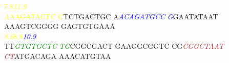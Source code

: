\documentclass[11pt,twoside,reqno,a4paper]{article}
\begin{document}
{\hspace*{1\charwidth}\hspace*{10\charwidth}\textcolor{Yellow}{7.8}\hspace*{1\charwidth}\hspace*{1\charwidth}\hspace*{1\charwidth}\hspace*{1\charwidth}\hspace*{10\charwidth}\textit{\textcolor{Yellow}{11.9}}\hspace*{1\charwidth}\hspace*{1\charwidth}\hspace*{1\charwidth}\\
\textit{\textcolor{Yellow}{A}}\textcolor{Yellow}{A}\textcolor{Yellow}{A}\textcolor{Yellow}{G}\textcolor{Yellow}{A}\textcolor{Yellow}{T}\textcolor{Yellow}{A}\textcolor{Yellow}{C}\textcolor{Yellow}{T}\textcolor{Yellow}{C}	\textcolor{Yellow}{C}TCTGACTGC	A\textit{\textcolor{Blue}{A}}\textit{\textcolor{Blue}{C}}\textit{\textcolor{Blue}{A}}\textit{\textcolor{Blue}{G}}\textit{\textcolor{Blue}{A}}\textit{\textcolor{Blue}{T}}\textit{\textcolor{Blue}{G}}\textit{\textcolor{Blue}{C}}\textit{\textcolor{Blue}{C}}	\textit{\textcolor{Blue}{G}}GAATATAAT	AAAGTCGGGG	GAGTGTGAAA	\\
\hspace*{0\charwidth}\textit{\textcolor{Yellow}{8.6}}\hspace*{-48\charwidth}\textcolor{Yellow}{8.8}\hspace*{1\charwidth}\hspace*{1\charwidth}\hspace*{-37\charwidth}\textit{\textcolor{Blue}{10.9}}\hspace*{1\charwidth}\hspace*{1\charwidth}\hspace*{1\charwidth}\hspace*{1\charwidth}\hspace*{1\charwidth}\\
TT\textit{\textcolor{Green}{G}}\textit{\textcolor{Green}{T}}\textit{\textcolor{Green}{G}}\textit{\textcolor{Green}{T}}\textit{\textcolor{Green}{G}}\textit{\textcolor{Green}{C}}\textit{\textcolor{Green}{T}}\textit{\textcolor{Green}{C}}	\textit{\textcolor{Green}{T}}\textit{\textcolor{Green}{G}}CGGCGACT	GAAGGCGGTC	CG\textit{\textcolor{Brown}{C}}\textit{\textcolor{Brown}{G}}\textit{\textcolor{Brown}{G}}\textit{\textcolor{Brown}{C}}\textit{\textcolor{Brown}{T}}\textit{\textcolor{Brown}{A}}\textit{\textcolor{Brown}{A}}\textit{\textcolor{Brown}{T}}	\textit{\textcolor{Brown}{C}}\textit{\textcolor{Brown}{T}}ATGACAGA	AAACATGTAA	\\
}
\end{document}
